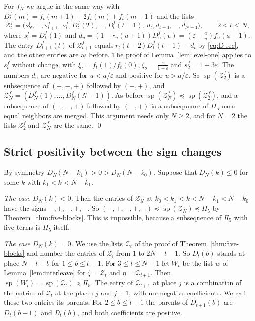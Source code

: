 For $f_N$ we argue in the same way with $D^f_t(m)=f_t(m+1)-2f_t(m)+f_t(m-1)$
and the lists
\[
 \mathcal Z^f_t=\bigl(s^f_N,\dots,s^f_{t+1},\ s^f_t,D^f_t(2),\dots,D^f_t(t-1),\ d_t,d_{t+1},\dots,d_{N-1}\bigr),
 \qquad2\le t\le N,
\]
where $s^f_t=D^f_t(1)$ and $d_u=(1-r_u(u+1))D^f_u(u)=(\varepsilon-\frac
au)f_u(u-1)$. The entry $D^f_{t+1}(t)$ of $\mathcal Z^f_{t+1}$ equals
$r_t(t-2)D^f_t(t-1)+d_t$ by \eqref{eq:D-rec}, and the other entries are as
before. The proof of Lemma~\ref{lem:level-one} applies to $s^f_t$ without
change, with $\xi_t=f_t(1)/f_t(0)$, $\xi_2=\frac\varepsilon{1-\varepsilon}$
and $s^f_2=1-3\varepsilon$. The numbers $d_u$ are negative for
$u<a/\varepsilon$ and positive for $u>a/\varepsilon$. So
$\operatorname{sp}(\mathcal Z^f_2)$ is a subsequence of $(+,-,+)$ followed by $(-,+)$,
and $\mathcal Z^f_N=(D^f_N(1),\dots,D^f_N(N-1))$. As before
$\operatorname{sp}(\mathcal Z^f_N)\preceq\operatorname{sp}(\mathcal Z^f_2)$, and a subsequence of $(+,-,+)$
followed by $(-,+)$ is a subsequence of $\Pi_5$ once equal neighbors are merged. This
argument needs only $N\ge2$, and for $N=2$ the lists $\mathcal Z^f_2$ and $\mathcal Z^f_N$ are
the same. \qed

\subsection{Strict positivity between the sign changes}\label{app:signs-holes}

By symmetry $D_N(N-k_1)>0>D_N(N-k_0)$. Suppose that $D_N(k)\le0$ for some $k$
with $k_1<k<N-k_1$.

\emph{The case $D_N(k)<0$.} Then the entries of $\mathcal Z_N$ at $k_0<k_1<k<N-k_1<N-k_0$
have the signs $-,+,-,+,-$. So $(-,+,-,+,-)\preceq\operatorname{sp}(\mathcal Z_N)\preceq\Pi_5$
by Theorem~\ref{thm:five-blocks}. This is impossible, because a subsequence of
$\Pi_5$ with five terms is $\Pi_5$ itself.

\emph{The case $D_N(k)=0$.} We use the lists $\mathcal Z_t$ of the proof of
Theorem~\ref{thm:five-blocks} and number the entries of $\mathcal Z_t$ from $1$ to
$2N-t-1$. So $D_t(b)$ stands at place $N-t+b$ for $1\le b\le t-1$. For
$3\le t\le N-1$ let $W_t$ be the list $w$ of Lemma~\ref{lem:interleave} for
$\zeta=\mathcal Z_t$ and $\eta=\mathcal Z_{t+1}$. Then
$\operatorname{sp}(W_t)=\operatorname{sp}(\mathcal Z_t)\preceq\Pi_5$. The entry of
$\mathcal Z_{t+1}$ at place $j$ is a combination of the entries of $\mathcal Z_t$ at the places
$j$ and $j+1$, with nonnegative coefficients. We call these two entries its
parents. For $2\le b\le t-1$ the parents of $D_{t+1}(b)$ are $D_t(b-1)$ and
$D_t(b)$, and both coefficients are positive.

